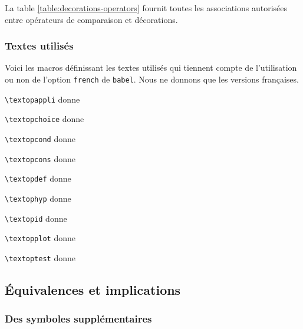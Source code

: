\documentclass[12pt,a4paper]{article}
\newcommand\env[1]{\texttt{#1}}
\newcommand\macro[1]{\env{\textbackslash{}#1}}
\theoremstyle{definition}
\begin{document}
La table \ref{table:decorations-operators}  fournit toutes les associations autorisées entre opérateurs de comparaison et décorations.




\subsubsection{Textes utilisés} \label{text-for-opes}

Voici les macros définissant les textes utilisés qui tiennent compte de l'utilisation ou non de l'option \verb+french+ de \verb+babel+. Nous ne donnons que les versions françaises.

\vspace{-.5em}


\begin{multicols}{2}
    \macro{textopappli} donne \emph{\og \textopappli \fg}

    \macro{textopchoice} donne \emph{\og \textopchoice \fg}

    \macro{textopcond} donne \emph{\og \textopcond \fg}

    \macro{textopcons} donne \emph{\og \textopcons \fg}

    \macro{textopdef} donne \emph{\og \textopdef \fg}

    \macro{textophyp} donne \emph{\og \textophyp \fg}

    \macro{textopid} donne \emph{\og \textopid \fg}

    \macro{textopplot} donne \emph{\og \textopplot \fg}

    \macro{textoptest} donne \emph{\og \textoptest \fg}
\vfill\null\end{multicols}




\subsection{Équivalences et implications}

\subsubsection{Des symboles supplémentaires}
\end{document}
